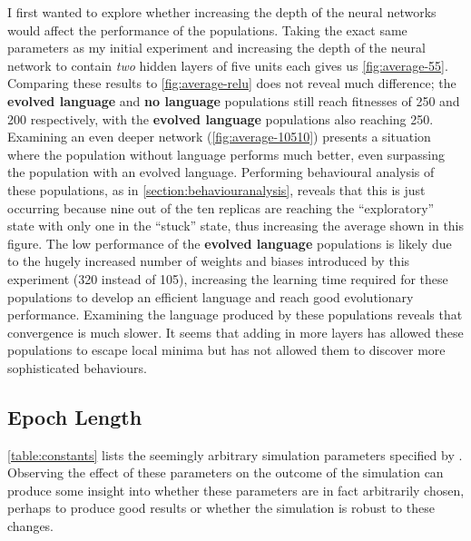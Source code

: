 \documentclass[12pt,a4paper]{report}
\begin{document}
I first wanted to explore whether increasing the depth of the neural networks would affect the performance of the populations. Taking the exact same parameters as my initial experiment and increasing the depth of the neural network to contain \emph{two} hidden layers of five units each gives us \cref{fig:average-55}. Comparing these results to \cref{fig:average-relu} does not reveal much difference; the {\bf evolved language} and {\bf no language} populations still reach fitnesses of 250 and 200 respectively, with the {\bf evolved language} populations also reaching 250. Examining an even deeper network (\cref{fig:average-10510}) presents a situation where the population without language performs much better, even surpassing the population with an evolved language. Performing behavioural analysis of these populations, as in \cref{section:behaviouranalysis}, reveals that this is just occurring because nine out of the ten replicas are reaching the ``exploratory'' state with only one in the ``stuck'' state, thus increasing the average shown in this figure. The low performance of the {\bf evolved language} populations is likely due to the hugely increased number of weights and biases introduced by this experiment (320 instead of 105), increasing the learning time required for these populations to develop an efficient language and reach good evolutionary performance. Examining the language produced by these populations reveals that convergence is much slower. It seems that adding in more layers has allowed these populations to escape local minima but has not allowed them to discover more sophisticated behaviours.

\subsection{Epoch Length}

\cref{table:constants} lists the seemingly arbitrary simulation parameters specified by \citet{Cangelosi1998}. Observing the effect of these parameters on the outcome of the simulation can produce some insight into whether these parameters are in fact arbitrarily chosen, perhaps to produce good results or whether the simulation is robust to these changes.
\end{document}
